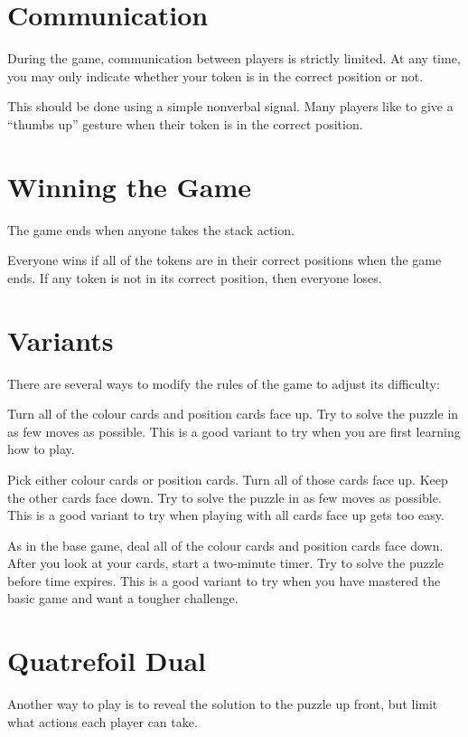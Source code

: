 \documentclass[a6paper, parskip=half, DIV=16, 10pt]{scrartcl}
\begin{document}
\section*{Communication}
During the game, communication between players is strictly limited. At any time, you may only indicate whether your token is in the correct position or not.

This should be done using a simple nonverbal signal. Many players like to give a ``thumbs up'' gesture when their token is in the correct position.
\newpage
\section*{Winning the Game}
The game ends when anyone takes the stack action.

Everyone wins if all of the tokens are in their correct positions when the game ends. If any token is not in its correct position, then everyone loses.

\section*{Variants}
There are several ways to modify the rules of the game to adjust its difficulty:
\begin{description}[leftmargin=0pt, labelsep=\widthof{\ }]
	\item[Nothing to Hide -] Turn all of the colour cards and position cards face up. Try to solve the puzzle in as few moves as possible. This is a good variant to try when you are first learning how to play.
	\item[Half and Half -] Pick either colour cards or position cards. Turn all of those cards face up. Keep the other cards face down. Try to solve the puzzle in as few moves as possible. This is a good variant to try when playing with all cards face up gets too easy.
	\item[Race the Clock -] As in the base game, deal all of the colour cards and position cards face down. After you look at your cards, start a two-minute timer. Try to solve the puzzle before time expires. This is a good variant to try when you have mastered the basic game and want a tougher challenge.
\end{description}
\newpage
\section*{Quatrefoil Dual}
Another way to play is to reveal the solution to the puzzle up front, but limit what actions each player can take.
\end{document}
